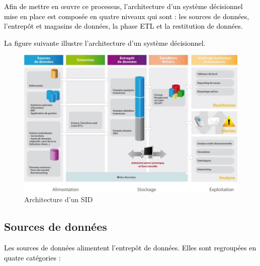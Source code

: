 \documentclass[a4paper,12pt]{report}
\begin{document}
\textcolor{black}{Afin de mettre en œuvre ce processus, l’architecture d’un système décisionnel mise en place est composée en quatre niveaux qui sont : les sources de données, l’entrepôt et magasins de données, la phase ETL et la restitution de données.}

\textcolor{black}{La figure suivante illustre l’architecture d’un système décisionnel.}

\begin{figure}[H]

\begin{center}
\includegraphics[width=1\linewidth]{./images/1}
\end{center}

\caption{Architecture d'un SID \citep{el2008ingenierie}}
\label{fig:1}

\end{figure}


\subsection{Sources de données}
\textcolor{black}{Les sources de données alimentent l’entrepôt de données. Elles sont regroupées en quatre catégories \citep{ponniah2001data} :}
\end{document}
